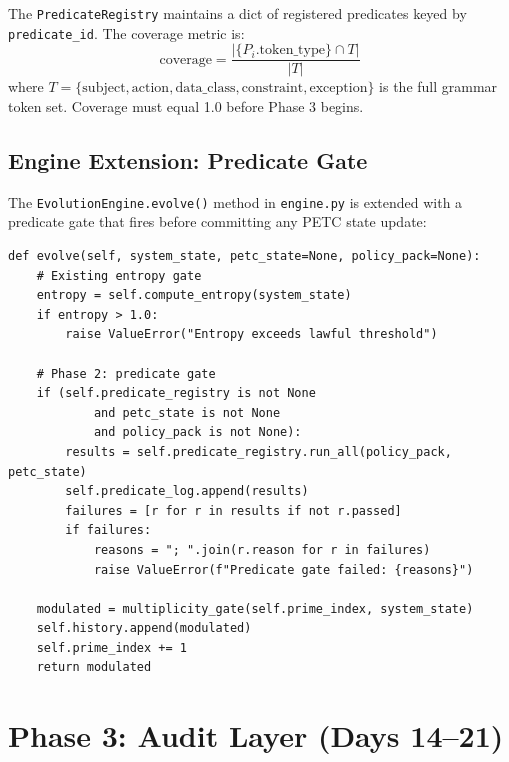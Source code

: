 \documentclass[12pt,letterpaper]{article}
\theoremstyle{definition}
\theoremstyle{remark}
\begin{document}
The \texttt{PredicateRegistry} maintains a dict of registered predicates keyed by
\texttt{predicate\_id}. The coverage metric is:
\[
  \text{coverage} = \frac{|\{P_i.\text{token\_type}\} \cap T|}{|T|} \tag{15}
\]
where \(T = \{\text{subject}, \text{action}, \text{data\_class}, \text{constraint},
\text{exception}\}\) is the full grammar token set. Coverage must equal 1.0 before
Phase 3 begins.

\subsection{Engine Extension: Predicate Gate}

The \texttt{EvolutionEngine.evolve()} method in \texttt{engine.py} is extended with
a predicate gate that fires before committing any PETC state update:

\begin{noteboxtc}
\begin{lstlisting}[style=pythonstyle, caption={Predicate gate in EvolutionEngine.evolve()}, label={lst:engine}]
def evolve(self, system_state, petc_state=None, policy_pack=None):
    # Existing entropy gate
    entropy = self.compute_entropy(system_state)
    if entropy > 1.0:
        raise ValueError("Entropy exceeds lawful threshold")

    # Phase 2: predicate gate
    if (self.predicate_registry is not None
            and petc_state is not None
            and policy_pack is not None):
        results = self.predicate_registry.run_all(policy_pack, petc_state)
        self.predicate_log.append(results)
        failures = [r for r in results if not r.passed]
        if failures:
            reasons = "; ".join(r.reason for r in failures)
            raise ValueError(f"Predicate gate failed: {reasons}")

    modulated = multiplicity_gate(self.prime_index, system_state)
    self.history.append(modulated)
    self.prime_index += 1
    return modulated
\end{lstlisting}
\end{noteboxtc}

\newpage

\section{Phase 3: Audit Layer (Days 14–21)}
\end{document}

